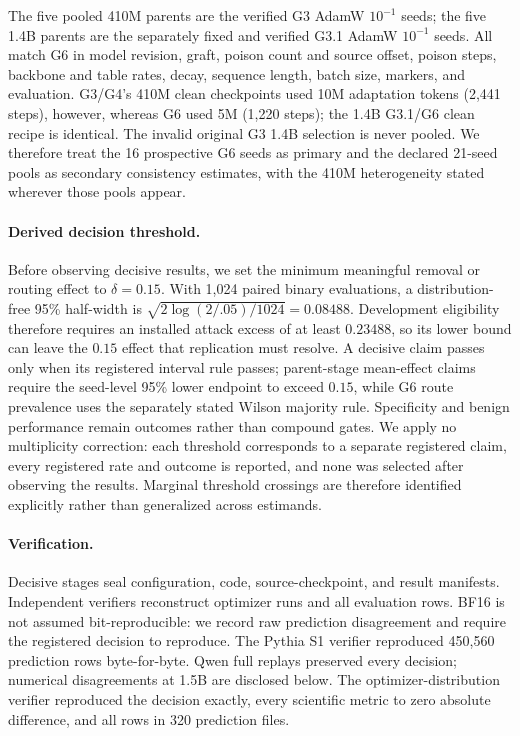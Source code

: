 \documentclass{article}
\begin{document}
The five pooled 410M parents are the verified G3 AdamW $10^{-1}$ seeds; the five
1.4B parents are the separately fixed and verified G3.1 AdamW $10^{-1}$ seeds.
All match G6 in model revision, graft, poison count and source offset, poison
steps, backbone and table rates, decay, sequence length, batch size, markers,
and evaluation. G3/G4's 410M clean checkpoints used 10M adaptation tokens
(2,441 steps), however, whereas G6 used 5M (1,220 steps); the 1.4B G3.1/G6
clean recipe is identical. The invalid original G3 1.4B selection is never
pooled. We therefore treat the 16 prospective G6 seeds as primary and the
declared 21-seed pools as secondary consistency estimates, with the 410M
heterogeneity stated wherever those pools appear.

\paragraph{Derived decision threshold.}
Before observing decisive results, we set the minimum meaningful removal or
routing effect to $\delta=0.15$. With 1,024 paired binary evaluations, a
distribution-free 95\% half-width is
$\sqrt{2\log(2/.05)/1024}=0.08488$. Development eligibility therefore requires
an installed attack excess of at least $0.23488$, so its lower bound can leave
the $0.15$ effect that replication must resolve. A decisive claim passes only
when its registered interval rule passes; parent-stage mean-effect claims
require the seed-level 95\% lower endpoint to exceed $0.15$, while G6 route
prevalence uses the separately stated Wilson majority rule.
Specificity and benign performance remain outcomes rather than compound gates.
We apply no multiplicity correction: each threshold corresponds to a separate
registered claim, every registered rate and outcome is reported, and none was
selected after observing the results. Marginal threshold crossings are
therefore identified explicitly rather than generalized across estimands.

\paragraph{Verification.}
Decisive stages seal configuration, code, source-checkpoint, and result
manifests. Independent verifiers reconstruct optimizer runs and all evaluation
rows. BF16 is not assumed bit-reproducible: we record raw prediction
disagreement and require the registered decision to reproduce. The Pythia S1
verifier reproduced 450,560 prediction rows byte-for-byte. Qwen full replays
preserved every decision; numerical disagreements at 1.5B are disclosed below.
The optimizer-distribution verifier reproduced the decision exactly, every
scientific metric to zero absolute difference, and all rows in 320 prediction
files.
\end{document}
